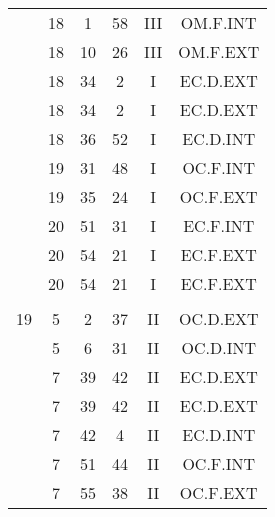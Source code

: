 \documentclass[12pt, a4paper]{article}
\begin{document}
\begin{multicols}{3}
{\begin{tabular}{c c c c c c}
	 	 	 	 & 18 & 1 & 58 & III & OM.F.INT\\%
	 	 	 	 & 18 & 10 & 26 & III & OM.F.EXT\\%
	 	 	 	 & 18 & 34 & 2 & I & EC.D.EXT\\%
	 	 	 	 & 18 & 34 & 2 & I & EC.D.EXT\\%
	 	 	 	 & 18 & 36 & 52 & I & EC.D.INT\\%
	 	 	 	 & 19 & 31 & 48 & I & OC.F.INT\\%
	 	 	 	 & 19 & 35 & 24 & I & OC.F.EXT\\%
	 	 	 	 & 20 & 51 & 31 & I & EC.F.INT\\%
	 	 	 	 & 20 & 54 & 21 & I & EC.F.EXT\\%
	 	 	 	 & 20 & 54 & 21 & I & EC.F.EXT\\%
	 	 	 	 & & & & & \\%
	 	 	 	19 & 5 & 2 & 37 & II & OC.D.EXT\\%
	 	 	 	 & 5 & 6 & 31 & II & OC.D.INT\\%
	 	 	 	 & 7 & 39 & 42 & II & EC.D.EXT\\%
	 	 	 	 & 7 & 39 & 42 & II & EC.D.EXT\\%
	 	 	 	 & 7 & 42 & 4 & II & EC.D.INT\\%
	 	 	 	 & 7 & 51 & 44 & II & OC.F.INT\\%
	 	 	 	 & 7 & 55 & 38 & II & OC.F.EXT\\%
	 	 \end{tabular}
 	}
\end{multicols}
\end{document}
